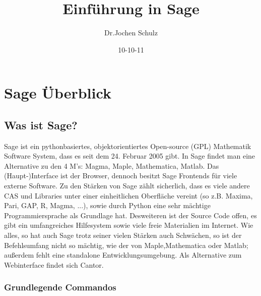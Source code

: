 \documentclass[fontsize=12pt,paper=a4,twoside,bibtotoc,idxtotoc,
liststotoc,pagesize,BCOR1.2cm,DIV15,chapterprefix,pagesize=pdftex]{scrbook}
\title{Einführung in Sage}
\author{Dr.Jochen Schulz}
\date{10-10-11}
\theoremstyle{plain}
\theoremstyle{definition}
\theoremstyle{remark}
\begin{document}
\maketitle
\tableofcontents

\chapter{Sage Überblick}
\section{Was ist Sage?}

Sage ist ein pythonbasiertes, objektorientiertes Open-source (GPL) Mathematik Software System, dass es seit dem 24. Februar 2005 gibt.
In Sage findet man eine Alternative zu den 4 M's: Magma, Maple, Mathematica, Matlab.
Das (Haupt-)Interface ist der Browser, dennoch besitzt Sage Frontends für viele externe Software.
Zu den Stärken von Sage zählt sicherlich, dass es viele andere CAS und Libraries unter einer einheitlichen Oberfläche vereint 
(so z.B. Maxima, Pari, GAP, R, Magma, ...), sowie durch Python eine sehr mächtige Programmiersprache als Grundlage hat. Desweiteren 
ist der Source Code offen, es gibt ein umfangreiches Hilfesystem sowie viele freie Materialien im Internet.
Wie alles, so hat auch Sage trotz seiner vielen Stärken auch Schwächen, so ist der Befehlsumfang nicht so mächtig, wie der von Maple,Mathematica 
oder Matlab; außerdem fehlt eine standalone Entwicklungsumgebung. Als Alternative zum Webinterface findet sich Cantor.

\subsection{Grundlegende Commandos}
\end{document}
